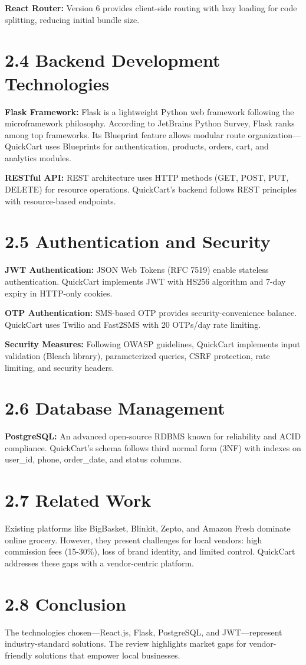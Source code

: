 \documentclass[12pt,a4paper]{report}
\begin{document}
\textbf{React Router:} Version 6 provides client-side routing with lazy loading for code splitting, reducing initial bundle size.

\section*{2.4 Backend Development Technologies}

\textbf{Flask Framework:} Flask is a lightweight Python web framework following the microframework philosophy. According to JetBrains Python Survey, Flask ranks among top frameworks. Its Blueprint feature allows modular route organization—QuickCart uses Blueprints for authentication, products, orders, cart, and analytics modules.

\textbf{RESTful API:} REST architecture uses HTTP methods (GET, POST, PUT, DELETE) for resource operations. QuickCart's backend follows REST principles with resource-based endpoints.

\section*{2.5 Authentication and Security}

\textbf{JWT Authentication:} JSON Web Tokens (RFC 7519) enable stateless authentication. QuickCart implements JWT with HS256 algorithm and 7-day expiry in HTTP-only cookies.

\textbf{OTP Authentication:} SMS-based OTP provides security-convenience balance. QuickCart uses Twilio and Fast2SMS with 20 OTPs/day rate limiting.

\textbf{Security Measures:} Following OWASP guidelines, QuickCart implements input validation (Bleach library), parameterized queries, CSRF protection, rate limiting, and security headers.

\section*{2.6 Database Management}

\textbf{PostgreSQL:} An advanced open-source RDBMS known for reliability and ACID compliance. QuickCart's schema follows third normal form (3NF) with indexes on user\_id, phone, order\_date, and status columns.

\section*{2.7 Related Work}

Existing platforms like BigBasket, Blinkit, Zepto, and Amazon Fresh dominate online grocery. However, they present challenges for local vendors: high commission fees (15-30\%), loss of brand identity, and limited control. QuickCart addresses these gaps with a vendor-centric platform.

\section*{2.8 Conclusion}

The technologies chosen—React.js, Flask, PostgreSQL, and JWT—represent industry-standard solutions. The review highlights market gaps for vendor-friendly solutions that empower local businesses.
\end{document}
